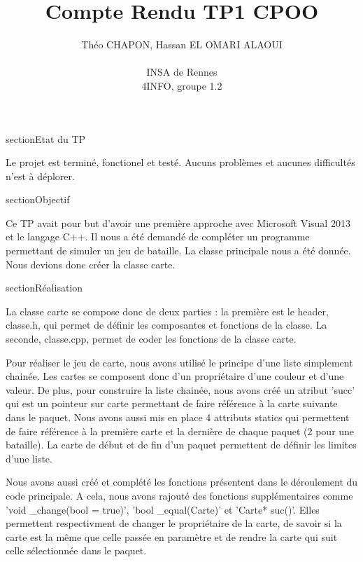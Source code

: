 \documentclass[a4paper,12pt]{article}
\author{
  Théo \textsc{CHAPON}, Hassan \textsc{EL OMARI ALAOUI} \\ \\
  INSA de Rennes \\
  4INFO, groupe 1.2
}
\title{Compte Rendu TP1 CPOO}
\begin{document}

section{Etat du TP}

Le projet est terminé, fonctionel et testé. Aucuns problèmes et aucunes difficultés n'est à déplorer.


section{Objectif}

Ce TP avait pour but d'avoir une première approche avec Microsoft Visual 2013 et le langage C++. Il nous a été demandé de 
compléter un programme permettant de simuler un jeu de bataille. La classe principale nous a été donnée. Nous devions donc 
créer la classe carte.


section{Réalisation}

La classe carte se compose donc de deux parties : la première est le header, classe.h, qui permet de définir les composantes
et fonctions de la classe. La seconde, classe.cpp, permet de coder les fonctions de la classe carte.

Pour réaliser le jeu de carte, nous avons utilisé le principe d'une liste simplement chainée. Les cartes se composent donc d'un
propriétaire d'une couleur et d'une valeur. De plus, pour construire la liste chainée, nous avons créé un atribut 'succ' qui
est un pointeur sur carte permettant de faire référence à la carte suivante dans le paquet. Nous avons aussi mis en place 4
attributs statics qui permettent de faire référence à la première carte et la dernière de chaque paquet (2 pour une bataille).
La carte de début et de fin d'un paquet permettent de définir les limites d'une liste.

Nous avons aussi créé et complété les fonctions présentent dans le déroulement du code principale. A cela, nous avons rajouté
des fonctions supplémentaires comme 'void _change(bool = true)', 'bool _equal(Carte)' et 'Carte* suc()'. Elles permettent
respectivment de changer le propriétaire de la carte, de savoir si la carte est la même que celle passée en paramètre et
de rendre la carte qui suit celle sélectionnée dans le paquet.




\end{document}

